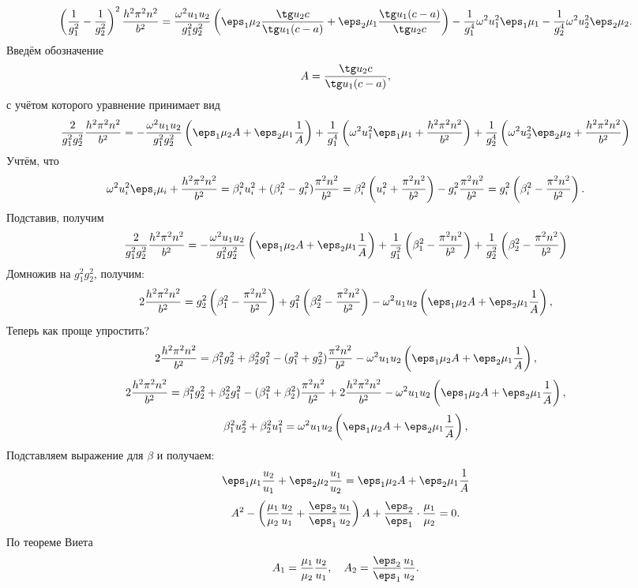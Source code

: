 \[
    \left( \frac{1}{g_1^2} - \frac{1}{g_2^2} \right)^2\frac{h^2\pi^2n^2}{b^2}=
    \frac{\omega^2u_1u_2}{g_1^2g_2^2}\left(\eps_1\mu_2\frac{\tg u_2 c}{\tg u_1
    (c-a)} + \eps_2\mu_1\frac{\tg u_1 (c-a)}{\tg u_2 c}\right) -\frac{1}{g_1^4}
    \omega^2u_1^2\eps_1\mu_1 - \frac{1}{g_2^4}\omega^2u_2^2\eps_2\mu_2.
\]
Введём обозначение
\[
    A = \frac{\tg u_2 c}{\tg u_1 (c-a)},
\]
с учётом которого уравнение принимает вид
\[
    \frac{2}{g_1^2 g_2^2}\frac{h^2\pi^2n^2}{b^2} =
    -\frac{\omega^2u_1u_2}{g_1^2g_2^2}\left(\eps_1\mu_2 A +
    \eps_2\mu_1\frac{1}{A}\right) +
    \frac{1}{g_1^4}
    \left(\omega^2u_1^2\eps_1\mu_1 + \frac{h^2\pi^2n^2}{b^2}\right) +
    \frac{1}{g_2^4}
    \left(\omega^2u_2^2\eps_2\mu_2 + \frac{h^2\pi^2n^2}{b^2}\right)
\]
Учтём, что
\[
    \omega^2u_i^2\eps_i\mu_i + \frac{h^2\pi^2n^2}{b^2} = \beta_i^2u_i^2 +
    (\beta_i^2 - g_i^2)\frac{\pi^2n^2}{b^2} =
    \beta_i^2\left( u_i^2 + \frac{\pi^2n^2}{b^2} \right) -
    g_i^2\frac{\pi^2n^2}{b^2} =
    g_i^2\left( \beta_i^2 - \frac{\pi^2n^2}{b^2}\right).
\]
Подставив, получим
\[
    \frac{2}{g_1^2 g_2^2}\frac{h^2\pi^2n^2}{b^2} =
    -\frac{\omega^2u_1u_2}{g_1^2g_2^2}\left(\eps_1\mu_2 A +
    \eps_2\mu_1\frac{1}{A}\right) +
    \frac{1}{g_1^2}
    \left(\beta_1^2 - \frac{\pi^2n^2}{b^2}\right) +
    \frac{1}{g_2^2}
    \left(\beta_2^2 - \frac{\pi^2n^2}{b^2}\right)
\]
Домножив на \( g_1^2g_2^2 \), получим:
\[
    2\frac{h^2\pi^2n^2}{b^2} = g_2^2
    \left(\beta_1^2 - \frac{\pi^2n^2}{b^2}\right) +
    g_1^2\left(\beta_2^2 - \frac{\pi^2n^2}{b^2}\right)-
    \omega^2u_1u_2\left(\eps_1\mu_2 A +
    \eps_2\mu_1\frac{1}{A}\right),
\]
Теперь как проще упростить?
\[
    2\frac{h^2\pi^2n^2}{b^2} =
    \beta_1^2 g_2^2 + \beta_2^2 g_1^2 -
    (g_1^2+g_2^2)\frac{\pi^2n^2}{b^2} -
    \omega^2u_1u_2\left(\eps_1\mu_2 A +
    \eps_2\mu_1\frac{1}{A}\right),
\]
\[
    2\frac{h^2\pi^2n^2}{b^2} =
    \beta_1^2 g_2^2 + \beta_2^2 g_1^2 -
    (\beta_1^2+\beta_2^2)\frac{\pi^2n^2}{b^2} +
    2\frac{h^2\pi^2n^2}{b^2} -
    \omega^2u_1u_2\left(\eps_1\mu_2 A +
    \eps_2\mu_1\frac{1}{A}\right),
\]
\[
    \beta_1^2u_2^2 + \beta_2^2u_1^2=
    \omega^2u_1u_2\left(\eps_1\mu_2 A +
    \eps_2\mu_1\frac{1}{A}\right),
\]
Подставляем выражение для \( \beta \) и получаем:
\[
    \eps_1\mu_1\frac{u_2}{u_1} + \eps_2\mu_2\frac{u_1}{u_2} =
    \eps_1\mu_2 A + \eps_2\mu_1\frac{1}{A}
\]
\[
    A^2 - \left(
    \frac{\mu_1}{\mu_2}\frac{u_2}{u_1} + \frac{\eps_2}{\eps_1}\frac{u_1}{u_2}
    \right)A + \frac{\eps_2}{\eps_1}\cdot\frac{\mu_1}{\mu_2} = 0.
\]
По теореме Виета
\[
    A_1 = \frac{\mu_1}{\mu_2}\frac{u_2}{u_1},\quad
    A_2 = \frac{\eps_2}{\eps_1}\frac{u_1}{u_2}.
\]
